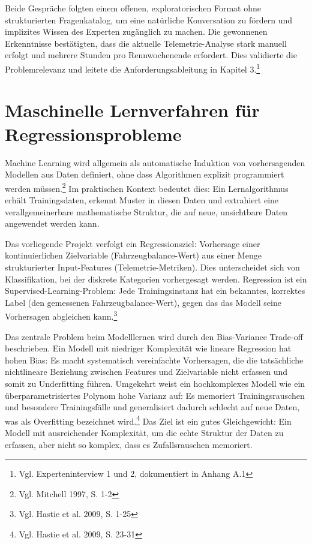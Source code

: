 Beide Gespräche folgten einem offenen, exploratorischen Format ohne strukturierten Fragenkatalog, um eine natürliche Konversation zu fördern und implizites Wissen des Experten zugänglich zu machen. Die gewonnenen Erkenntnisse bestätigten, dass die aktuelle Telemetrie-Analyse stark manuell erfolgt und mehrere Stunden pro Rennwochenende erfordert. Dies validierte die Problemrelevanz und leitete die Anforderungsableitung in Kapitel 3.\footnote{Vgl. Experteninterview 1 und 2, dokumentiert in Anhang A.1} 



\section{Maschinelle Lernverfahren für Regressionsprobleme}

Machine Learning wird allgemein als automatische Induktion von vorhersagenden Modellen aus Daten definiert, ohne dass Algorithmen explizit programmiert werden müssen.\footnote{Vgl. Mitchell 1997, S. 1-2} Im praktischen Kontext bedeutet dies: Ein Lernalgorithmus erhält Trainingsdaten, erkennt Muster in diesen Daten und extrahiert eine verallgemeinerbare mathematische Struktur, die auf neue, unsichtbare Daten angewendet werden kann.

Das vorliegende Projekt verfolgt ein Regressionsziel: Vorhersage einer kontinuierlichen Zielvariable (Fahrzeugbalance-Wert) aus einer Menge strukturierter Input-Features (Telemetrie-Metriken). Dies unterscheidet sich von Klassifikation, bei der diskrete Kategorien vorhergesagt werden. Regression ist ein Supervised-Learning-Problem: Jede Trainingsinstanz hat ein bekanntes, korrektes Label (den gemessenen Fahrzeugbalance-Wert), gegen das das Modell seine Vorhersagen abgleichen kann.\footnote{Vgl. Hastie et al. 2009, S. 1-25}

Das zentrale Problem beim Modelllernen wird durch den Bias-Variance Trade-off beschrieben. Ein Modell mit niedriger Komplexität wie lineare Regression hat hohen Bias: Es macht systematisch vereinfachte Vorhersagen, die die tatsächliche nichtlineare Beziehung zwischen Features und Zielvariable nicht erfassen und somit zu Underfitting führen. Umgekehrt weist ein hochkomplexes Modell wie ein überparametrisiertes Polynom hohe Varianz auf: Es memoriert Trainingsrauschen und besondere Trainingsfälle und generalisiert dadurch schlecht auf neue Daten, was als Overfitting bezeichnet wird.\footnote{Vgl. Hastie et al. 2009, S. 23-31} Das Ziel ist ein gutes Gleichgewicht: Ein Modell mit ausreichender Komplexität, um die echte Struktur der Daten zu erfassen, aber nicht so komplex, dass es Zufallsrauschen memoriert.

